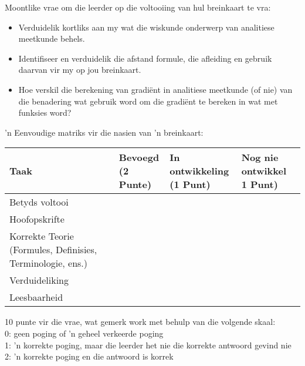 Moontlike vrae om die leerder op die voltooiing van hul breinkaart te vra:
\begin{itemize}
\item
Verduidelik kortliks aan my wat die wiskunde onderwerp van analitiese
meetkunde behels.
\item
Identifiseer en verduidelik die afstand formule, die afleiding en
gebruik daarvan vir my op jou breinkaart.
\item
Hoe verskil die berekening van gradiënt in analitiese meetkunde (of
nie) van die benadering wat gebruik word om die gradiënt te bereken in
wat met funksies word?
\end{itemize}
'n Eenvoudige matriks vir die nasien van 'n breinkaart:
\begin{table}[H]
 \begin{center}
  \begin{tabular}{|p{3cm}|p{2.5cm}|p{2.5cm}|p{3cm}|} \hline
  \textbf{Taak} & \textbf{Bevoegd \newline(2 Punte)} & \textbf{In ontwikkeling \newline(1 Punt)}& \textbf{Nog nie ontwikkel \newline 1 Punt)}\\ \hline
Betyds voltooi &&&\\ \hline
Hoofopskrifte &&&\\ \hline
Korrekte Teorie (Formules, Definisies, Terminologie, ens.) &&&\\ \hline
Verduideliking &&&\\ \hline
Leesbaarheid&&&\\ \hline

  \end{tabular}

 \end{center}

\end{table}

10 punte vir die vrae, wat gemerk work met behulp van die volgende skaal:\\
0: geen poging of 'n geheel verkeerde poging\\
1: 'n korrekte poging, maar die leerder het nie die korrekte antwoord gevind nie\\
2: 'n korrekte poging en die antwoord is korrek

